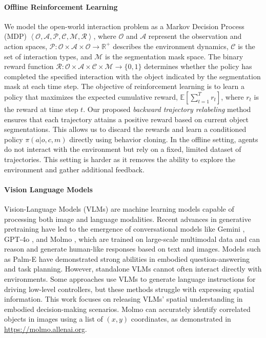 
\paragraph{Offline Reinforcement Learning}
We model the open-world interaction problem as a Markov Decision Process (MDP) $\left< \mathcal{O}, \mathcal{A}, \mathcal{P}, \mathcal{C}, \mathcal{M}, \mathcal{R} \right>$, where $\mathcal{O}$ and $\mathcal{A}$ represent the observation and action spaces, $\mathcal{P}: \mathcal{O} \times \mathcal{A} \times \mathcal{O} \rightarrow \mathbb{R}^{+}$ describes the environment dynamics, $\mathcal{C}$ is the set of interaction types, and $\mathcal{M}$ is the segmentation mask space. The binary reward function $\mathcal{R}: \mathcal{O} \times \mathcal{A} \times \mathcal{C} \times \mathcal{M} \rightarrow \{0, 1\}$ determines whether the policy has completed the specified interaction with the object indicated by the segmentation mask at each time step. The objective of reinforcement learning is to learn a policy that maximizes the expected cumulative reward, $\mathbb{E} \left[ \sum_{t=1}^{T} r_t \right]$, where $r_t$ is the reward at time step $t$. 
Our proposed \emph{backward trajectory relabeling} method ensures that each trajectory attains a positive reward based on current object segmentations. This allows us to discard the rewards and learn a conditioned policy $\pi(a | o, c, m)$ directly using behavior cloning. In the offline setting, agents do not interact with the environment but rely on a fixed, limited dataset of trajectories. This setting is harder as it removes the ability to explore the environment and gather additional feedback. 

\paragraph{Vision Language Models} 
Vision-Language Models (VLMs) are machine learning models capable of processing both image and language modalities. Recent advances in generative pretraining have led to the emergence of conversational models like Gemini \citep{gemini}, GPT-4o \citep{gpt4}, and Molmo \citep{molmo}, which are trained on large-scale multimodal data and can reason and generate human-like responses based on text and images. Models such as Palm-E \citep{palm-e} have demonstrated strong abilities in embodied question-answering and task planning. However, standalone VLMs cannot often interact directly with environments. Some approaches use VLMs to generate language instructions for driving low-level controllers, but these methods struggle with expressing spatial information. This work focuses on releasing VLMs’ spatial understanding in embodied decision-making scenarios. 
Molmo can accurately identify correlated objects in images using a list of $(x, y)$ coordinates, as demonstrated in \url{https://molmo.allenai.org}. 

